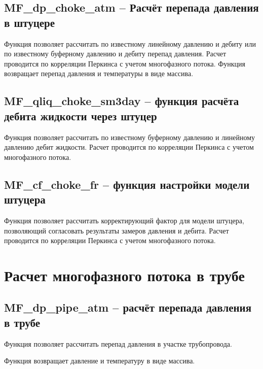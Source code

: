\subsection{MF\_dp\_choke\_atm – Расчёт перепада давления в штуцере}
Функция позволяет рассчитать по известному линейному давлению и дебиту или по известному буферному давлению и дебиту перепад давления.  Расчет проводится по корреляции Перкинса \cite{Perkins_1993} с учетом многофазного потока.  
Функция возвращает перепад давления и температуры в виде массива.


\subsection{MF\_qliq\_choke\_sm3day – функция расчёта дебита жидкости через штуцер}
Функция позволяет рассчитать по известному буферному давлению и линейному давлению дебит жидкости. Расчет проводится по корреляции Перкинса \cite{Perkins_1993} с учетом многофазного потока.  



\subsection{MF\_cf\_choke\_fr – функция настройки модели штуцера}
Функция позволяет рассчитать корректирующий фактор для модели штуцера, позволяющий согласовать результаты замеров давления и дебита. Расчет проводится по корреляции Перкинса \cite{Perkins_1993} с учетом многофазного потока.  


\newpage
\section{Расчет многофазного потока в трубе}



\subsection{MF\_dp\_pipe\_atm – расчёт перепада давления в трубе}

Функция позволяет рассчитать перепад давления в участке трубопровода. 

Функция возвращает давление и температуру в виде массива.


